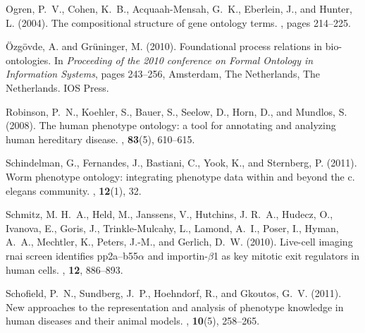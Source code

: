 \documentclass{bioinfo}
\begin{document}
\begin{thebibliography}{}
Ogren, P.~V., Cohen, K.~B., Acquaah-Mensah, G.~K., Eberlein, J., and Hunter, L.
  (2004).
\newblock The compositional structure of gene ontology terms.
, pages 214--225.

\"{O}zg\"{o}vde, A. and Gr\"{u}ninger, M. (2010).
\newblock Foundational process relations in bio-ontologies.
\newblock In {\em Proceeding of the 2010 conference on Formal Ontology in
  Information Systems\/}, pages 243--256, Amsterdam, The Netherlands, The
  Netherlands. IOS Press.

Robinson, P.~N., Koehler, S., Bauer, S., Seelow, D., Horn, D., and Mundlos, S.
  (2008).
\newblock The human phenotype ontology: a tool for annotating and analyzing
  human hereditary disease.
, {\bf 83}(5), 610--615.

Schindelman, G., Fernandes, J., Bastiani, C., Yook, K., and Sternberg, P.
  (2011).
\newblock Worm phenotype ontology: integrating phenotype data within and beyond
  the c. elegans community.
, {\bf 12}(1), 32.

Schmitz, M. H.~A., Held, M., Janssens, V., Hutchins, J. R.~A., Hudecz, O.,
  Ivanova, E., Goris, J., Trinkle-Mulcahy, L., Lamond, A.~I., Poser, I., Hyman,
  A.~A., Mechtler, K., Peters, J.-M., and Gerlich, D.~W. (2010).
\newblock Live-cell imaging rnai screen identifies pp2a–b55$\alpha$ and
  importin-$\beta$1 as key mitotic exit regulators in human cells.
, {\bf 12}, 886--893.

Schofield, P.~N., Sundberg, J.~P., Hoehndorf, R., and Gkoutos, G.~V. (2011).
\newblock New approaches to the representation and analysis of phenotype
  knowledge in human diseases and their animal models.
, {\bf 10}(5), 258--265.


\end{thebibliography}
\end{document}
